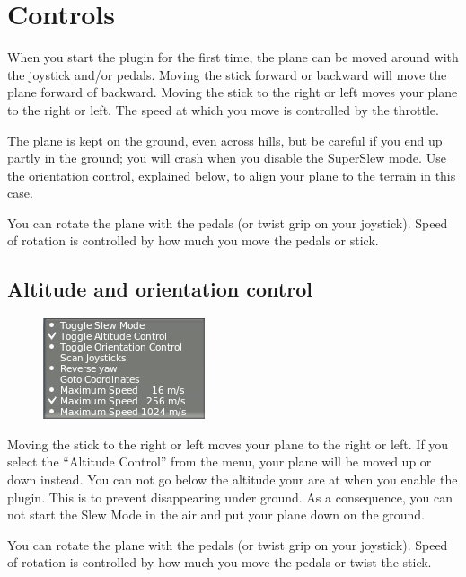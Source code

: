 \documentclass[a4paper,12pt]{article}
\begin{document}
\section*{Controls}

When you start the plugin for the first time, the plane can be moved
around with the joystick and/or pedals. Moving the stick forward or
backward will move the plane forward of backward. Moving the stick to
the right or left moves your plane to the right or left.  The speed at
which you move is controlled by the throttle.

The plane is kept on the ground, even across hills, but be careful if you end up
partly in the ground; you will crash when you disable the SuperSlew mode. Use
the orientation control, explained below, to align your plane to the terrain in
this case.

\vspace{0.5\baselineskip}
You can rotate the plane with the pedals (or twist grip on your
joystick). Speed of rotation is controlled by how much you move the
pedals or stick.

\subsection*{Altitude and orientation control}

\begin{figure}[h!]%
\centering
\includegraphics[scale=1]{slewaltitude.png}
\label{fig:slewaltitude}
\end{figure}

Moving the stick to the right or left moves your plane to the right or
left. If you select the ``Altitude Control'' from the menu, your plane
will be moved up or down instead. You can not go below the altitude
your are at when you enable the plugin. This is to prevent
disappearing under ground. As a consequence, you can not start the
Slew Mode in the air and put your plane down on the ground.

\vspace{0.5\baselineskip}
You can rotate the plane with the pedals (or twist grip on your
joystick). Speed of rotation is controlled by how much you move the
pedals or twist the stick.
\end{document}
